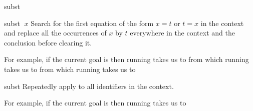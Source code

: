 \begin{tactic}{subst}
  \begin{tsyntax}{subst $\;x$}
    Search for the first equation of the form $x = t$ or $t = x$ in
    the context and replace all the occurrences of $x$ by $t$
    everywhere in the context and the conclusion before clearing it.

  For example, if the current goal is
   then
  running 
  takes us to
  from which running
  takes us to
  from which running
  takes us to
  \end{tsyntax}

  \begin{tsyntax}{subst}
     Repeatedly apply  to all identifiers in
     the context.

     For example, if the current goal is
      then
     running 
     takes us to
  \end{tsyntax}
\end{tactic}
